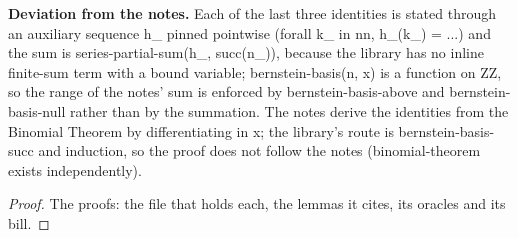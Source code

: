 %
\noindent\textbf{Deviation from the notes.} Each of the last three identities is stated through an auxiliary sequence h\_ pinned pointwise (forall k\_ in nn, h\_(k\_) = ...) and the sum is series-partial-sum(h\_, succ(n\_)), because the library has no inline finite-sum term with a bound variable; bernstein-basis(n, x) is a function on ZZ, so the range of the notes' sum is enforced by bernstein-basis-above and bernstein-basis-null rather than by the summation. The notes derive the identities from the Binomial Theorem by differentiating in x; the library's route is bernstein-basis-succ and induction, so the proof does not follow the notes (binomial-theorem exists independently).
%
\renewcommand{\thethm}{5.7}
\begin{cor}\label{thm:bernstein-uniform-approximation-ccint}
%
%
\end{cor}
%
\begin{proof}
%
The proofs: the file that holds each, the lemmas it cites, its oracles and its bill.
%
%
%
%
\end{proof}

